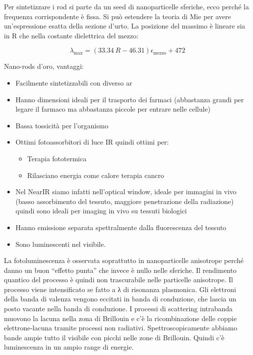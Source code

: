 Per sintetizzare i rod si parte da un seed di nanoparticelle sferiche,
ecco perché la frequenza corrispondente è fissa. Si può estendere la
teoria di Mie per avere un'espressione esatta della sezione d'urto. La
posizione del massimo è lineare sia in R che nella costante dielettrica
del mezzo:

\[\lambda_{\max} = \left( 33.34\ R - 46.31 \right)\epsilon_{\text{mezzo}} + 472\]

Nano-rods d'oro, vantaggi:

\begin{itemize}
\item
  Facilmente sintetizzabili con diverso ar
\item
  Hanno dimensioni ideali per il trasporto dei farmaci (abbastanza
  grandi per legare il farmaco ma abbastanza piccole per entrare nelle
  cellule)
\item
  Bassa tossicità per l'organismo
\item
  Ottimi fotoassorbitori di luce IR quindi ottimi per:

  \begin{itemize}
  \item
    Terapia fototermica
  \item
    Rilasciano energia come calore terapia cancro
  \end{itemize}
\item
  Nel NearIR siamo infatti nell'optical window, ideale per immagini in
  vivo (basso assorbimento del tessuto, maggiore penetrazione della
  radiazione) quindi sono ideali per imaging in vivo su tessuti
  biologici
\item
  Hanno emissione separata spettralmente dalla fluorescenza del tessuto
\item
  Sono luminescenti nel visibile.
\end{itemize}

La fotoluminescenza è osservata soprattutto in nanoparticelle anisotrope
perché danno un buon ``effetto punta'' che invece è nullo nelle
sferiche. Il rendimento quantico del processo è quindi non trascurabile
nelle particelle anisotrope. Il processo viene intensificato se fatto a
λ di risonanza plasmonica. Gli elettroni della banda di valenza vengono
eccitati in banda di conduzione, che lascia un posto vacante nella banda
di conduzione. I processi di scattering intrabanda muovono la lacuna
nella zona di Brillouin e c'è la ricombinazione delle coppie
elettrone-lacuna tramite processi non radiativi. Spettroscopicamente
abbiamo bande ampie tutto il visibile con picchi nelle zone di
Brillouin. Quindi c'è luminescenza in un ampio range di energie.

